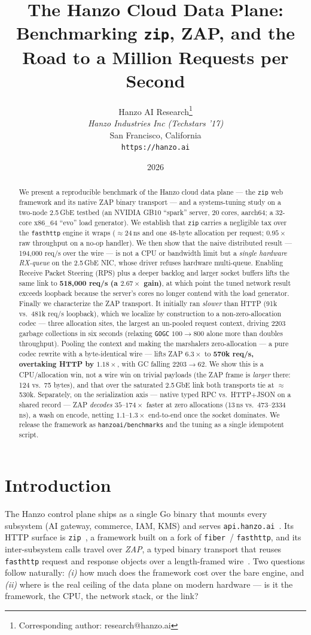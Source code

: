 \documentclass[11pt,twocolumn]{article}
\title{The Hanzo Cloud Data Plane: Benchmarking \texttt{zip}, ZAP, and the
Road to a Million Requests per Second}
\author{
    Hanzo AI Research\thanks{Corresponding author: research@hanzo.ai} \\
    \textit{Hanzo Industries Inc (Techstars '17)} \\
    San Francisco, California \\
    \texttt{https://hanzo.ai}
}
\date{2026}
\begin{document}
\hanzocoverpage

\begin{abstract}
We present a reproducible benchmark of the Hanzo cloud data plane --- the
\texttt{zip} web framework and its native ZAP binary transport --- and a
systems-tuning study on a two-node 2.5\,GbE testbed (an NVIDIA GB10 ``spark''
server, 20 cores, aarch64; a 32-core x86\_64 ``evo'' load generator). We
establish that \texttt{zip} carries a negligible tax over the \texttt{fasthttp}
engine it wraps ($\approx$24\,ns and one 48-byte allocation per request;
$0.95\times$ raw throughput on a no-op handler). We then show that the naive
distributed result --- 194{,}000 req/s over the wire --- is not a CPU or
bandwidth limit but a \emph{single hardware RX-queue} on the 2.5\,GbE NIC, whose
driver refuses hardware multi-queue. Enabling Receive Packet Steering (RPS) plus
a deeper backlog and larger socket buffers lifts the same link to
\textbf{518{,}000 req/s (a $2.67\times$ gain)}, at which point the tuned network
result exceeds loopback because the server's cores no longer contend with the
load generator. Finally we characterize the ZAP transport. It initially ran
\emph{slower} than HTTP (91k vs.\ 481k req/s loopback), which we localize by
construction to a non-zero-allocation codec --- three allocation sites, the
largest an un-pooled request context, driving 2203 garbage collections in six
seconds (relaxing \texttt{GOGC} $100\to800$ alone more than doubles throughput).
Pooling the context and making the marshalers zero-allocation --- a pure codec
rewrite with a byte-identical wire --- lifts ZAP $6.3\times$ to \textbf{570k
req/s, overtaking HTTP by $1.18\times$}, with GC falling $2203\to62$. We show
this is a CPU/allocation win, not a wire win on trivial payloads (the ZAP frame
is \emph{larger} there: 124 vs.\ 75 bytes), and that over the saturated 2.5\,GbE
link both transports tie at $\approx$530k. Separately, on the serialization axis
--- native typed RPC vs.\ HTTP+JSON on a shared record --- ZAP \emph{decodes}
$35$--$174\times$ faster at zero allocations (13\,ns vs.\ 473--2334\,ns), a wash
on encode, netting $1.1$--$1.3\times$ end-to-end once the socket dominates. We
release the framework as \texttt{hanzoai/benchmarks} and the tuning as a single
idempotent script.
\end{abstract}

\section{Introduction}
The Hanzo control plane ships as a single Go binary that mounts every subsystem
(AI gateway, commerce, IAM, KMS) and serves \texttt{api.hanzo.ai}~\cite{hip0106}.
Its HTTP surface is \texttt{zip}~\cite{zip}, a framework built on a fork of
\texttt{fiber}~/ \texttt{fasthttp}, and its inter-subsystem calls travel over
\emph{ZAP}, a typed binary transport that reuses \texttt{fasthttp} request and
response objects over a length-framed wire~\cite{zaphttp}. Two questions follow
naturally: \emph{(i)} how much does the framework cost over the bare engine, and
\emph{(ii)} where is the real ceiling of the data plane on modern hardware ---
is it the framework, the CPU, the network stack, or the link?
\end{document}
